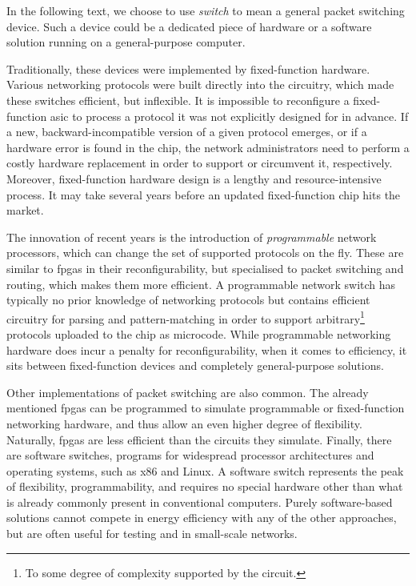In the following text, we choose to use \emph{switch} to mean a general packet
switching device. Such a device could be a dedicated piece of hardware or a
software solution running on a general-purpose computer.

Traditionally, these devices were implemented by fixed-function hardware.
Various networking protocols were built directly into the circuitry, which made
these switches efficient, but inflexible. It is impossible to reconfigure a
fixed-function \acrfull{asic} to process a protocol it was not explicitly
designed for in advance. If a new, backward-incompatible version of a given
protocol emerges, or if a hardware error is found in the chip, the network
administrators need to perform a costly hardware replacement in order to support
or circumvent it, respectively. Moreover, fixed-function hardware design is a
lengthy and resource-intensive process. It may take several years before an
updated fixed-function chip hits the market.

The innovation of recent years is the introduction of \emph{programmable}
network processors, which can change the set of supported protocols on the fly.
These are similar to \acrshort{fpga}s in their reconfigurability, but
specialised to packet switching and routing, which makes them more efficient. A
programmable network switch has typically no prior knowledge of networking
protocols but contains efficient circuitry for parsing and pattern-matching in
order to support arbitrary\footnote{To some degree of complexity supported by
the circuit.} protocols uploaded to the chip as microcode. While programmable
networking hardware does incur a penalty for reconfigurability, when it comes to
efficiency, it sits between fixed-function devices and completely
general-purpose solutions.

Other implementations of packet switching are also common. The already mentioned
\acrlong{fpga}s can be programmed to simulate programmable or fixed-function
networking hardware, and thus allow an even higher degree of flexibility.
Naturally, \acrshort{fpga}s are less efficient than the circuits they simulate.
Finally, there are software switches, programs for widespread processor
architectures and operating systems, such as x86 and Linux. A software switch
represents the peak of flexibility, programmability, and requires no special
hardware other than what is already commonly present in conventional computers.
Purely software-based solutions cannot compete in energy efficiency with any of
the other approaches, but are often useful for testing and in small-scale
networks.

